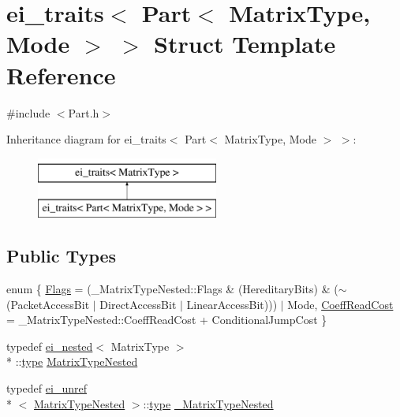 \hypertarget{structei__traits_3_01_part_3_01_matrix_type_00_01_mode_01_4_01_4}{\section{ei\-\_\-traits$<$ Part$<$ Matrix\-Type, Mode $>$ $>$ Struct Template Reference}
\label{structei__traits_3_01_part_3_01_matrix_type_00_01_mode_01_4_01_4}
}


{\ttfamily \#include $<$Part.\-h$>$}

Inheritance diagram for ei\-\_\-traits$<$ Part$<$ Matrix\-Type, Mode $>$ $>$\-:\begin{figure}[H]
\begin{center}
\leavevmode
\includegraphics[height=2.000000cm]{structei__traits_3_01_part_3_01_matrix_type_00_01_mode_01_4_01_4}
\end{center}
\end{figure}
\subsection*{Public Types}
\begin{DoxyCompactItemize}
\item 
enum \{ \hyperlink{structei__traits_3_01_part_3_01_matrix_type_00_01_mode_01_4_01_4_aa87ea8c3475c6335760b0eee25e09bb6a019399190b7ad69d5d9d88016e228af8}{Flags} = (\-\_\-\-Matrix\-Type\-Nested\-:\-:Flags \& (Hereditary\-Bits) \& ($\sim$(Packet\-Access\-Bit $|$ Direct\-Access\-Bit $|$ Linear\-Access\-Bit))) $|$ Mode, 
\hyperlink{structei__traits_3_01_part_3_01_matrix_type_00_01_mode_01_4_01_4_aa87ea8c3475c6335760b0eee25e09bb6ad39ab73f25155b217cb4707027296339}{Coeff\-Read\-Cost} = \-\_\-\-Matrix\-Type\-Nested\-:\-:Coeff\-Read\-Cost + Conditional\-Jump\-Cost
 \}
\item 
typedef \hyperlink{structei__nested}{ei\-\_\-nested}$<$ Matrix\-Type $>$\\*
\-::\hyperlink{glext_8h_a7d05960f4f1c1b11f3177dc963a45d86}{type} \hyperlink{structei__traits_3_01_part_3_01_matrix_type_00_01_mode_01_4_01_4_ac493b4d95824c6a2fa7291bc93745b4b}{Matrix\-Type\-Nested}
\item 
typedef \hyperlink{structei__unref}{ei\-\_\-unref}\\*
$<$ \hyperlink{structei__traits_3_01_part_3_01_matrix_type_00_01_mode_01_4_01_4_ac493b4d95824c6a2fa7291bc93745b4b}{Matrix\-Type\-Nested} $>$\-::\hyperlink{glext_8h_a7d05960f4f1c1b11f3177dc963a45d86}{type} \hyperlink{structei__traits_3_01_part_3_01_matrix_type_00_01_mode_01_4_01_4_abf53a489501dc62cc03ece77757ad982}{\-\_\-\-Matrix\-Type\-Nested}
\end{DoxyCompactItemize}


